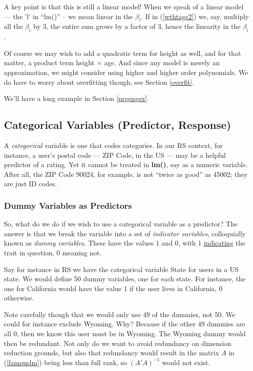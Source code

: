 A key point is that this is still a linear model! When we speak of a
linear model --- the 'l' in ``lm()'' -- we mean linear in the $\beta_i$.
If in (\ref{wthtage2}) we, say, multiply all the $\beta_i$ by 3, the
entire sum grows by a factor of 3, hence the linearity in the $\beta_i$.

Of course we may wish to add a quadratic term for height as well, and
for that matter, a product term height $\times$ age.  And since any
model is merely an approximation, we might consider using higher and
higher order polynomials.  We do have to worry about overfitting though;
see Section \ref{overfit}.

We'll have a long example in Section \ref{prgengex}.

\subsection{Categorical Variables (Predictor, Response)}

A \textit{categorical} variable is one that codes categories.  In our RS
context, for instance, a user's postal code --- ZIP Code, in the US ---
may be a helpful predictor of a rating.  Yet it cannot be treated in
\textbf{lm()}, say as a numeric variable.  After all, the ZIP Code
90024, for example, is not ``twice as good'' as 45002; they are just ID
codes.

\subsubsection{Dummy Variables as Predictors}

So, what do we do if we wish to use a categorical variable as a
predictor?  The answer is that we break the variable into a set of
\textit{indicator variables}, colloquially known as \textit{dummy
variables}.  These have the values 1 and 0, with 1
\underline{indicating} the trait in question, 0 meaning not.

Say for instance in RS we have the categorical variable State for users
in a US state.  We would define 50 dummy variables, one for each state.
For instance, the one for California would have the value 1 if the user
lives in California, 0 otherwise.

Note carefully though that we would only use 49 of the dummies, not 50.
We could for instance exclude Wyoming.  Why? Because if the other 49
dummies are all 0, then we know this user must be in Wyoming.  The
Wyoming dummy would then be redundant. Not only do we want to avoid
redundancy on dimension reduction grounds, but also that redundancy
would result in the matrix $A$ in (\ref{famouslm}) being less than full
rank, so $(A'A)^{-1}$ would not exist.

